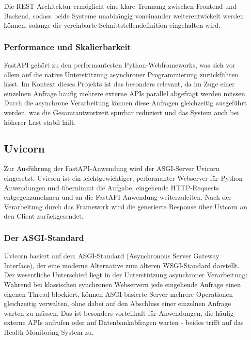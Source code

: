Die REST-Architektur ermöglicht eine klare Trennung zwischen Frontend und Backend, sodass beide Systeme unabhängig voneinander weiterentwickelt werden können, solange die vereinbarte Schnittstellendefinition eingehalten wird.

\subsubsection{Performance und Skalierbarkeit}
FastAPI gehört zu den performantesten Python-Webframeworks, was sich vor allem auf die native Unterstützung asynchroner Programmierung zurückführen lässt. \cite{fastapi_performance} Im Kontext dieses Projekts ist das besonders relevant, da im Zuge einer einzelnen Anfrage häufig mehrere externe APIs parallel abgefragt werden müssen. Durch die asynchrone Verarbeitung können diese Anfragen gleichzeitig ausgeführt werden, was die Gesamtantwortzeit spürbar reduziert und das System auch bei höherer Last stabil hält.

\subsection{Uvicorn}
Zur Ausführung der FastAPI-Anwendung wird der ASGI-Server Uvicorn eingesetzt. Uvicorn ist ein leichtgewichtiger, performanter Webserver für Python-Anwendungen und übernimmt die Aufgabe, eingehende HTTP-Requests entgegenzunehmen und an die FastAPI-Anwendung weiterzuleiten. Nach der Verarbeitung durch das Framework wird die generierte Response über Uvicorn an den Client zurückgesendet. \cite{uvicorn_docs}

\subsubsection{Der ASGI-Standard}
Uvicorn basiert auf dem ASGI-Standard (Asynchronous Server Gateway Interface), der eine moderne Alternative zum älteren WSGI-Standard darstellt. Der wesentliche Unterschied liegt in der Unterstützung asynchroner Verarbeitung: Während bei klassischen synchronen Webservern jede eingehende Anfrage einen eigenen Thread blockiert, können ASGI-basierte Server mehrere Operationen gleichzeitig verwalten, ohne dabei auf den Abschluss einer einzelnen Anfrage warten zu müssen. Das ist besonders vorteilhaft für Anwendungen, die häufig externe APIs aufrufen oder auf Datenbankabfragen warten - beides trifft auf das Health-Monitoring-System zu. \cite{asgi_spec}

